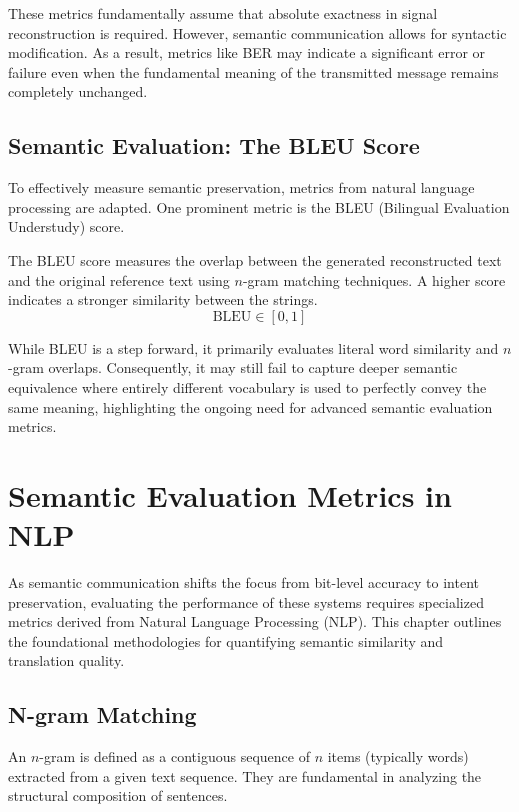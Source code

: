 \documentclass[10pt, conference]{IEEEtran}
\begin{document}
These metrics fundamentally assume that absolute exactness in signal reconstruction is required. However, semantic communication allows for syntactic modification. As a result, metrics like BER may indicate a significant error or failure even when the fundamental meaning of the transmitted message remains completely unchanged. 

\subsection{\textbf{Semantic Evaluation: The BLEU Score}}
To effectively measure semantic preservation, metrics from natural language processing are adapted. One prominent metric is the BLEU (Bilingual Evaluation Understudy) score. 

The BLEU score measures the overlap between the generated reconstructed text and the original reference text using $n$-gram matching techniques. A higher score indicates a stronger similarity between the strings. 
\begin{equation}
    \text{BLEU} \in [0, 1]
\end{equation}

While BLEU is a step forward, it primarily evaluates literal word similarity and $n$-gram overlaps. Consequently, it may still fail to capture deeper semantic equivalence where entirely different vocabulary is used to perfectly convey the same meaning, highlighting the ongoing need for advanced semantic evaluation metrics.

\section{\large \textbf{Semantic Evaluation Metrics in NLP}}

As semantic communication shifts the focus from bit-level accuracy to intent preservation, evaluating the performance of these systems requires specialized metrics derived from Natural Language Processing (NLP). This chapter outlines the foundational methodologies for quantifying semantic similarity and translation quality.

\subsection{\textbf{N-gram Matching}}
An $n$-gram is defined as a contiguous sequence of $n$ items (typically words) extracted from a given text sequence. They are fundamental in analyzing the structural composition of sentences.
\end{document}
